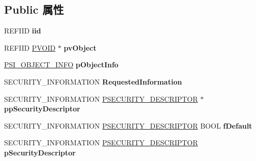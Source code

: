 \subsection*{Public 属性}
\begin{DoxyCompactItemize}
\item 
\mbox{\label{structiface_i_security_information_vbtl_aa49db739c5570bffd194535f9efe1980}} 
R\+E\+F\+I\+ID {\bfseries iid}
\item 
\mbox{\label{structiface_i_security_information_vbtl_a76b4dcd68719b26df7a7df5a2f74828e}} 
R\+E\+F\+I\+ID \hyperlink{interfacevoid}{P\+V\+O\+ID} $\ast$ {\bfseries pv\+Object}
\item 
\mbox{\label{structiface_i_security_information_vbtl_af445ad9fd891e3a6de75602911cf6b2f}} 
\hyperlink{struct___s_i___o_b_j_e_c_t___i_n_f_o}{P\+S\+I\+\_\+\+O\+B\+J\+E\+C\+T\+\_\+\+I\+N\+FO} {\bfseries p\+Object\+Info}
\item 
\mbox{\label{structiface_i_security_information_vbtl_a59c01d79dec298b20a5b9161d67bbb5f}} 
S\+E\+C\+U\+R\+I\+T\+Y\+\_\+\+I\+N\+F\+O\+R\+M\+A\+T\+I\+ON {\bfseries Requested\+Information}
\item 
\mbox{\label{structiface_i_security_information_vbtl_a6a09314905d69d38de6db01d9e2ce568}} 
S\+E\+C\+U\+R\+I\+T\+Y\+\_\+\+I\+N\+F\+O\+R\+M\+A\+T\+I\+ON \hyperlink{struct___s_e_c_u_r_i_t_y___d_e_s_c_r_i_p_t_o_r}{P\+S\+E\+C\+U\+R\+I\+T\+Y\+\_\+\+D\+E\+S\+C\+R\+I\+P\+T\+OR} $\ast$ {\bfseries pp\+Security\+Descriptor}
\item 
\mbox{\label{structiface_i_security_information_vbtl_a0f9f94b4e8115961d8d334d3bcbf3d1d}} 
S\+E\+C\+U\+R\+I\+T\+Y\+\_\+\+I\+N\+F\+O\+R\+M\+A\+T\+I\+ON \hyperlink{struct___s_e_c_u_r_i_t_y___d_e_s_c_r_i_p_t_o_r}{P\+S\+E\+C\+U\+R\+I\+T\+Y\+\_\+\+D\+E\+S\+C\+R\+I\+P\+T\+OR} B\+O\+OL {\bfseries f\+Default}
\item 
\mbox{\label{structiface_i_security_information_vbtl_a8df5153254e5ef17037ba616c488229f}} 
S\+E\+C\+U\+R\+I\+T\+Y\+\_\+\+I\+N\+F\+O\+R\+M\+A\+T\+I\+ON \hyperlink{struct___s_e_c_u_r_i_t_y___d_e_s_c_r_i_p_t_o_r}{P\+S\+E\+C\+U\+R\+I\+T\+Y\+\_\+\+D\+E\+S\+C\+R\+I\+P\+T\+OR} {\bfseries p\+Security\+Descriptor}

\end{DoxyCompactItemize}
